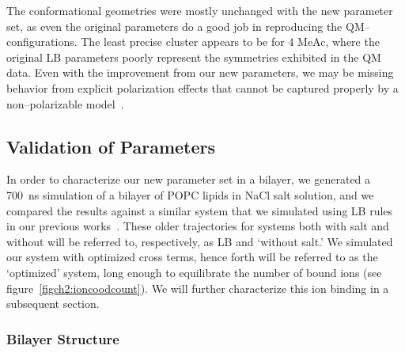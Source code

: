 The conformational geometries were mostly unchanged with the new
parameter set, as even the original parameters do a good job in reproducing the QM--configurations. 
The least precise cluster appears to be for 4 MeAc, 
where the original LB parameters poorly represent the symmetries exhibited in the QM data. 
Even with the improvement from our new parameters, 
we may be missing behavior from explicit polarization effects that
cannot be captured properly by a non--polarizable model~\cite{varma:2010}.

\subsection{Validation of Parameters}

In order to characterize our new parameter set in a bilayer, 
we generated a 700~ns simulation of a bilayer of POPC lipids in NaCl salt solution, 
and we compared the results against a similar system that we simulated using
LB rules in our previous works~\cite{kruczek:2017,kruczek:2019}. 
These older trajectories for systems both with salt and without will be referred to, 
respectively, as  LB and `without salt.'  
We simulated our system with optimized cross terms, 
hence forth will be referred to as the `optimized' system, 
long enough to equilibrate the number of bound ions (see figure~\ref{figch2:ioncoodcount}). 
We will further characterize this ion binding in a subsequent section.

\subsubsection{Bilayer Structure}

